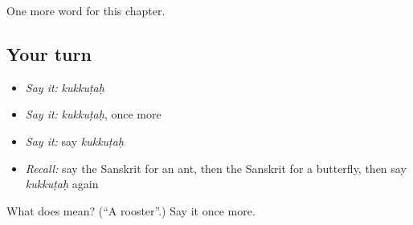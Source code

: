 \begin{grammarlens}[title={What you've built}]
One more word for this chapter.
\end{grammarlens}

\subsection*{Your turn}
\begin{itemize}
\raggedright
  \item \emph{Say it:} \emph{kukkuṭaḥ}
  \item \emph{Say it:} \emph{kukkuṭaḥ}, once more
  \item \emph{Say it:} say \emph{kukkuṭaḥ}
  \item \emph{Recall:} say the Sanskrit for an ant, then the Sanskrit for a butterfly, then say \emph{kukkuṭaḥ} again
\end{itemize}

\begin{tcolorbox}[breakable,colback=teal!4,colframe=teal!35!black,title={Before you move on}]
What does  mean? (\textquotedblleft{}A rooster\textquotedblright{}.) Say it once more.
\end{tcolorbox}
